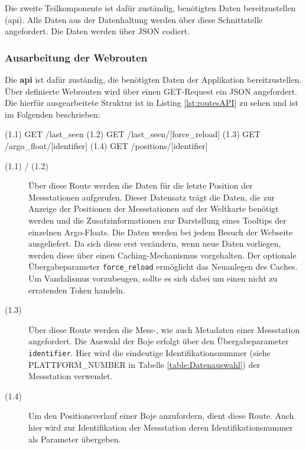 Die zweite Teilkomponente ist dafür zuständig, benötigten Daten bereitzustellen (api). Alle Daten aus der Datenhaltung werden über diese Schnittstelle angefordert. Die Daten werden über JSON codiert.


\subsubsection{Ausarbeitung der Webrouten} \label{sec:entwurfRoutes}


Die \textbf{api} ist dafür zuständig, die benötigten Daten der Applikation bereitzustellen. Über definierte Webrouten wird über einen GET-Request ein JSON angefordert. Die  hierfür ausgearbeitete Struktur ist in Listing \ref{lst:routesAPI} zu sehen und ist im Folgenden beschrieben:

\begin{python}[label={lst:routesAPI}, caption={Webrouten der Datenrepresentation}]
(1.1) GET     /last_seen
(1.2) GET     /last_seen/[force_reload]
(1.3) GET     /argo_float/[identifier]
(1.4) GET     /positions/[identifier]
\end{python}

\begin{description}
 \item [(1.1) / (1.2)]
    Über diese Route  werden die Daten für die letzte Position der Messstationen aufgerufen. Dieser Datensatz trägt die Daten, die zur Anzeige der Positionen der Messstationen auf der Weltkarte benötigt werden und die Zusatzinformationen zur Darstellung eines Tooltips der einzelnen Argo-Floats. Die Daten werden bei jedem Besuch der Webseite ausgeliefert. Da sich diese erst verändern, wenn neue Daten vorliegen, werden diese über einen Caching-Mechanismus vorgehalten. Der optionale Übergabeparameter \texttt{force\_reload} ermöglicht das Neuanlegen des Caches. Um Vandalismus vorzubeugen, sollte es sich dabei um einen nicht zu  erratenden Token handeln.

 \item [(1.3)]
    Über diese Route werden die Mess-, wie auch Metadaten einer Messstation angefordert. Die Auswahl der Boje erfolgt über den Übergabeparameter \texttt{identifier}. Hier wird die eindeutige Identifikationsnummer  (siehe PLATTFORM\_NUMBER in Tabelle \ref{table:Datenauswahl}) der Messstation verwendet.

 \item [(1.4)]
    Um den Positionsverlauf einer Boje anzufordern, dient diese Route. Auch hier wird zur Identifikation der Messstation deren Identifikationsnummer als Parameter übergeben.
\end{description}



